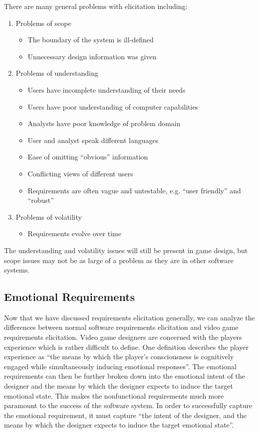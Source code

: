 There are many general problems with elicitation including\cite{mcdermid1989requirements}:
\begin{enumerate}
	\item Problems of scope
	\begin{itemize}
		\item The boundary of the system is ill-defined
		\item Unnecessary design information was given
	\end{itemize}
	\item Problems of understanding
	\begin{itemize}
		\item Users have incomplete understanding of their needs
		\item Users have poor understanding of computer capabilities
		\item Analysts have poor knowledge of problem domain
		\item User and analyst speak different languages
		\item Ease of omitting ``obvious'' information
		\item Conflicting views of different users
		\item Requirements are often vague and untestable, e.g. ``user friendly'' and ``robust''
	\end{itemize}
	\item Problems of volatility
	\begin{itemize}
		\item Requirements evolve over time
	\end{itemize}
\end{enumerate}
The understanding and volatility issues will still be present in game design, but scope issues may not be as large of a problem as they are in other software systems.

\subsection{Emotional Requirements}

Now that we have discussed requirements elicitation generally, we can analyze the differences between normal software requirements elicitation and video game requirements elicitation. Video game designers are concerned with the players experience which is rather difficult to define. One definition describes the player experience as ``the means by which the player's consciousness is cognitively engaged while simultaneously inducing emotional responses''\cite{callele2006emotional}. The emotional requirements can then be further broken down into the emotional intent of the designer and the means by which the designer expects to induce the target emotional state\cite{callele2006emotional}. This makes the nonfunctional requirements much more paramount to the success of the software system. In order to successfully capture the emotional requirement, it must capture ``the intent of the designer, and the means by which the designer expects to induce the target emotional state''\cite{callele2006emotional}.

